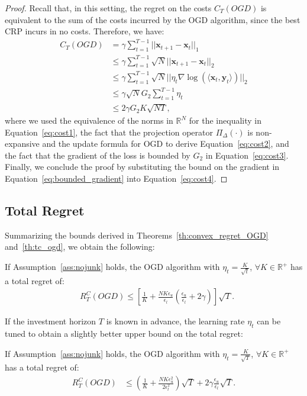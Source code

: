 \begin{proof}
Recall that, in this setting, the regret on the costs $C_T(OGD)$ is equivalent to the sum of the costs incurred by the OGD algorithm, since the best CRP incurs in no costs.
Therefore, we have:
\begin{align}
    C_T(OGD) & = \gamma \sum\limits_{t=1}^{T-1} ||\mathbf{x}_{t+1} - \mathbf{x}_{t}||_1 \\
    & \leq \gamma\sum\limits_{t=1}^{T-1} \sqrt{N} ||\mathbf{x}_{t+1} - \mathbf{x}_{t}||_2 \label{eq:cost1}\\
    & \leq \gamma\sum\limits_{t=1}^{T-1}\sqrt{N}|| \eta_t \nabla \log( \langle \mathbf{x}_t, \mathbf{y}_t \rangle)||_2 \label{eq:cost2}\\
    &\leq \gamma\sqrt{N} G_2 \sum\limits_{t=1}^{T-1} \eta_t \label{eq:cost3}\\
    & \leq 2\gamma G_2K\sqrt{NT}, \label{eq:cost4}
\end{align}
where we used the equivalence of the norms in $\mathbb{R}^N$ for the inequality in Equation~\eqref{eq:cost1}, the fact that the projection operator $\Pi_{\Delta}(\cdot)$ is non-expansive and the update formula for OGD to derive Equation~\eqref{eq:cost2}, and the fact that the gradient of the loss is bounded by $G_2$ in Equation~\eqref{eq:cost3}. 
Finally, we conclude the proof by substituting the bound on the gradient in Equation~\eqref{eq:bounded_gradient} into Equation~\eqref{eq:cost4}.
\end{proof}

\subsection{Total Regret}
Summarizing the bounds derived in Theorems~\ref{th:convex_regret_OGD} and~\ref{th:tc_ogd}, we obtain the following:
\begin{theorem} \label{thm:total_regret}
    If Assumption~\ref{ass:nojunk} holds, the OGD algorithm with $\eta_t = \frac{K}{\sqrt{t}}$,  $\forall K \in \mathbb{R}^+$ has a total regret of:
    \begin{align*}
        & R_T^C(OGD) \le \left[ \frac{1}{K} + \frac{NK\epsilon_u}{\epsilon_l}\left( \frac{\epsilon_u}{\epsilon_l} + 2 \gamma \right) \right] \sqrt{T}. %
    \end{align*}
\end{theorem}
If the investment horizon $T$ is known in advance, the learning rate $\eta_t$ can be tuned to obtain a slightly better upper bound on the total regret:
\begin{corollary}\label{cor:OGD_T_known}
   If Assumption~\ref{ass:nojunk} holds, the OGD algorithm with $\eta_t=\frac{K}{\sqrt{T}}$, $\forall K \in \mathbb{R}^+$ has a total regret of:
    \begin{align}\label{eq:OGD_T_known}
    R_T^C(OGD) &\leq \left( \frac{1}{K} + \frac{NK \epsilon_u^2}{2 \epsilon_l^2} \right) \sqrt{T} + 2 \gamma  \frac{\epsilon_u}{\epsilon_l} \sqrt{T}.
    \end{align}
\end{corollary}


